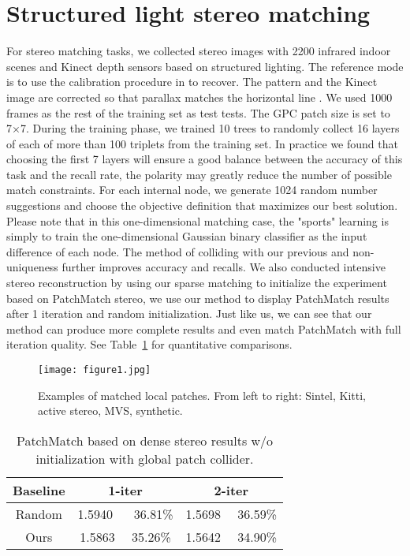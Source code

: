 \documentclass[10pt,twocolumn,letterpaper]{article}
\begin{document}
\section{ Structured light stereo matching}
For stereo matching tasks, we collected stereo images with 2200 infrared indoor scenes and Kinect depth sensors based on structured lighting. The reference mode is to use the calibration procedure in\cite{Fanello_2016_Hyperdepth} to recover. The pattern and the Kinect image are corrected so that parallax matches the horizontal line \cite{Fanello_2016_Hyperdepth}. We used 1000 frames as the rest of the training set as test tests. The GPC patch size is set to 7×7. During the training phase, we trained 10 trees to randomly collect 16 layers of each of more than 100 triplets from the training set. In practice we found that choosing the first 7 layers will ensure a good balance between the accuracy of this task and the recall rate, the polarity may greatly reduce the number of possible match constraints. For each internal node, we generate 1024 random number suggestions and choose the objective definition that maximizes our best solution. Please note that in this one-dimensional matching case, the "sports" learning is simply to train the one-dimensional Gaussian binary classifier as the input difference of each node. The method of colliding with our previous and non-uniqueness further improves accuracy and recalls. We also conducted intensive stereo reconstruction by using our sparse matching to initialize the experiment based on PatchMatch stereo\cite{Bleyer_2011_Patchmatch}, we use our method to display PatchMatch results after 1 iteration and random initialization. Just like us, we can see that our method can produce more complete results and even match PatchMatch with full iteration quality. See Table~\ref{table1} for quantitative comparisons.
\begin{figure}
	\centering
	\texttt{[image: figure1.jpg]}
	\caption{Examples of matched local patches. From left to right:
		Sintel, Kitti, active stereo, MVS, synthetic. }\label{pic1}
\end{figure}
\begin{table}[h]%
	\centering 
	\caption{ PatchMatch based on dense stereo results w/o initialization
		with global patch collider.}\label{table1}
	\tabcolsep 0.1in 
	\begin{tabular} {c|c|c}
		\hline
			Baseline& 1-iter&2-iter \\
			\hline
	Random &1.5940 ~~ 36.81\%& 1.5698 ~~36.59\% \\
			\hline
			Ours& 1.5863~~ 35.26\% &1.5642~~ 34.90\% \\
			\hline
	\end{tabular}
\end{table}
\end{document}
